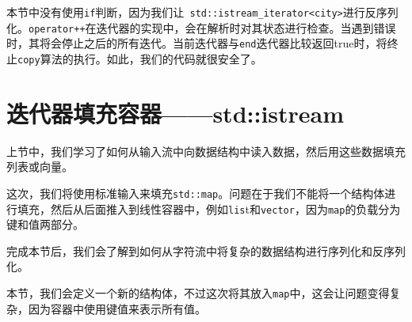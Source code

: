本节中没有使用\texttt{if}判断，因为我们让\texttt{ std::istream\_iterator<city>}进行反序列化。\texttt{operator++}在迭代器的实现中，会在解析时对其状态进行检查。当遇到错误时，其将会停止之后的所有迭代。当前迭代器与\texttt{end}迭代器比较返回true时，将终止\texttt{copy}算法的执行。如此，我们的代码就很安全了。


\section{迭代器填充容器——std::istream}

上节中，我们学习了如何从输入流中向数据结构中读入数据，然后用这些数据填充列表或向量。

这次，我们将使用标准输入来填充\texttt{std::map}。问题在于我们不能将一个结构体进行填充，然后从后面推入到线性容器中，例如\texttt{lis}t和\texttt{vector}，因为\texttt{map}的负载分为键和值两部分。

完成本节后，我们会了解到如何从字符流中将复杂的数据结构进行序列化和反序列化。


本节，我们会定义一个新的结构体，不过这次将其放入\texttt{map}中，这会让问题变得复杂，因为容器中使用键值来表示所有值。

